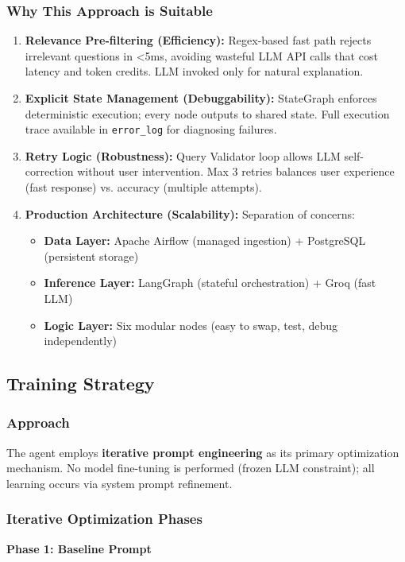 \documentclass{article}
\begin{document}
\subsubsection{Why This Approach is Suitable}
\begin{enumerate}
  \item \textbf{Relevance Pre-filtering (Efficiency):} Regex-based fast path rejects irrelevant questions in <5ms, avoiding wasteful LLM API calls that cost latency and token credits. LLM invoked only for natural explanation.
  \item \textbf{Explicit State Management (Debuggability):} StateGraph enforces deterministic execution; every node outputs to shared state. Full execution trace available in \texttt{error\_log} for diagnosing failures.
  \item \textbf{Retry Logic (Robustness):} Query Validator loop allows LLM self-correction without user intervention. Max 3 retries balances user experience (fast response) vs. accuracy (multiple attempts).
  \item \textbf{Production Architecture (Scalability):} Separation of concerns:
  \begin{itemize}
    \item \textbf{Data Layer:} Apache Airflow (managed ingestion) + PostgreSQL (persistent storage)
    \item \textbf{Inference Layer:} LangGraph (stateful orchestration) + Groq (fast LLM)
    \item \textbf{Logic Layer:} Six modular nodes (easy to swap, test, debug independently)
  \end{itemize}
\end{enumerate}

\subsection{Training Strategy}

\subsubsection{Approach}
The agent employs \textbf{iterative prompt engineering} as its primary optimization mechanism. No model fine-tuning is performed (frozen LLM constraint); all learning occurs via system prompt refinement.

\subsubsection{Iterative Optimization Phases}
\noindent\textbf{Phase 1: Baseline Prompt}
\end{document}
